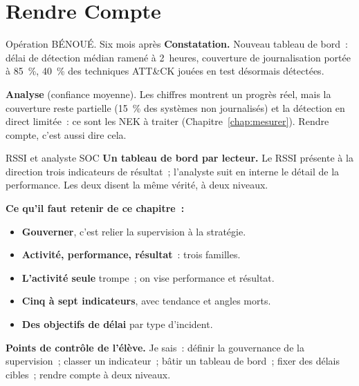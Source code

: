 \section{Rendre Compte}
\label{sec:c03-rendre}

\begin{boxscenario}{Opération BÉNOUÉ. Six mois après}
\textbf{Constatation.} Nouveau tableau de bord~: délai de détection médian
ramené à 2~heures, couverture de journalisation portée à 85~\%, 40~\% des
techniques ATT\&CK jouées en test désormais détectées.

\medskip
\textbf{Analyse} (confiance moyenne). Les chiffres montrent un progrès réel,
mais la couverture reste partielle (15~\% des systèmes non journalisés) et la
détection en direct limitée~: ce sont les NEK à traiter
(Chapitre~\ref{chap:mesurer}). Rendre compte, c'est aussi dire cela.
\end{boxscenario}

\begin{boxmetier}{RSSI et analyste SOC}
\textbf{Un tableau de bord par lecteur.} Le RSSI présente à la direction trois
indicateurs de résultat~; l'analyste suit en interne le détail de la
performance. Les deux disent la même vérité, à deux niveaux.
\end{boxmetier}

\separateur

\begin{boxresume}
\textbf{Ce qu'il faut retenir de ce chapitre~:}
\begin{itemize}
    \item \textbf{Gouverner}, c'est relier la supervision à la stratégie.
    \item \textbf{Activité, performance, résultat}~: trois familles.
    \item \textbf{L'activité seule} trompe~; on vise performance et résultat.
    \item \textbf{Cinq à sept indicateurs}, avec tendance et angles morts.
    \item \textbf{Des objectifs de délai} par type d'incident.
\end{itemize}
\end{boxresume}

\begin{boxinfo}
\textbf{Points de contrôle de l'élève.} Je sais~: définir la gouvernance de
la supervision~; classer un indicateur~; bâtir un tableau de bord~; fixer des
délais cibles~; rendre compte à deux niveaux.
\end{boxinfo}

